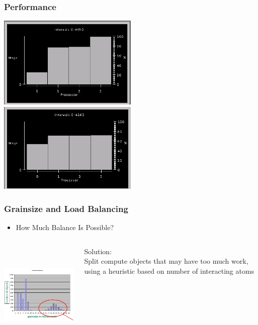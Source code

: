  \begin{frame}
 \frametitle{Performance}
 \begin{centering}
 \includegraphics[width=0.5\textwidth]{figures/beforeLB}
 \includegraphics[width=0.5\textwidth]{figures/afterLB}
 \end{centering}
 \end{frame}

\begin{frame}[fragile]
\frametitle{Grainsize and Load Balancing}
\begin{itemize}
\item[] How Much Balance Is Possible?
\end{itemize}
\begin{columns}
  \begin{column}[T]{2.8in}
  \includegraphics[width=2.8in, height=2.0in]{figures/histogramGrains}
  \end{column}

  \begin{column}[T]{5cm}
  Solution:\\ 
  Split compute objects that may have too much work,
  using a heuristic based on number of interacting atoms
  \end{column}
\end{columns}
\end{frame}


